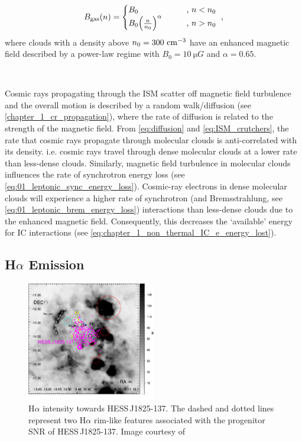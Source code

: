 \begin{equation}
    \begin{aligned}
        B_\text{gas}\qty(n)=
    \begin{cases}
        B_0 \qquad &\text{, } n < n_0 \\
        B_0\qty(\frac{n}{n_0})^\alpha \qquad &\text{, } n > n_0
    \end{cases}\text{ ,}
    \end{aligned} \label{eq:ISM_crutchers}
\end{equation}
\noindent where clouds with a density above $n_0=300~\si{\per\centi\meter\cubed}$ have an enhanced magnetic field described by a power-law regime with $B_0=10~\si{\micro G}$ and $\alpha=0.65$.
\par~\par 
Cosmic rays propagating through the ISM scatter off magnetic field turbulence and the overall motion is described by a random walk/diffusion (see \autoref{chapter_1_cr_propagation}), where the rate of diffusion is related to the strength of the magnetic field. From \autoref{eq:diffusion} and \autoref{eq:ISM_crutchers}, the rate that cosmic rays propagate through molecular clouds is anti-correlated with its density. i.e. cosmic rays travel through dense molecular clouds at a lower rate than less-dense clouds. Similarly, magnetic field turbulence in molecular clouds influences the rate of synchrotron energy loss (see \autoref{eq:01_leptonic_sync_energy_loss}). Cosmic-ray electrons in dense molecular clouds will experience a higher rate of synchrotron (and Bremsstrahlung, see \autoref{eq:01_leptonic_brem_energy_loss}) interactions than less-dense clouds due to the enhanced magnetic field. Consequently, this decreases the `available' energy for IC interactions (see \autoref{eq:chapter_1_non_thermal_IC_e_energy_lost}). 

\subsection{H$\alpha$ Emission}

\begin{figure}
	\centering
	\includegraphics[width=0.5\textwidth]{06_Interstellar_Medium/Images/Theory/Fabien_Halpha.pdf}
	\caption{H$\alpha$ intensity towards \mbox{HESS\,J1825-137}. The dashed and dotted lines represent two H$\alpha$ rim-like features associated with the progenitor SNR of \mbox{HESS\,J1825-137}. Image courtesy of \citep{2016MNRAS.458.2813V}}
	\label{fig:06_1825_SNR}
\end{figure}

